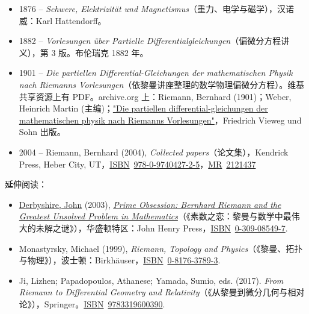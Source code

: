 \begin{itemize}
\item
  {1876 -- \emph{Schwere, Elektrizität und Magnetismus}（重力、电学与磁学），汉诺威：Karl Hattendorff。}
\item
  {1882 -- \emph{Vorlesungen über Partielle Differentialgleichungen}（偏微分方程讲义），第 3 版。布伦瑞克 1882 年。}
\item
  {1901 -- \emph{Die partiellen Differential-Gleichungen der mathematischen Physik nach Riemann\textquotesingle s Vorlesungen}（依黎曼讲座整理的数学物理偏微分方程）。维基共享资源上有 PDF。archive.org 上：Riemann, Bernhard (1901)；Weber, Heinrich Martin (主编)；\href{https://archive.org/details/diepartiellendi02webegoog}{"Die partiellen differential-gleichungen der mathematischen physik nach Riemann\textquotesingle s Vorlesungen"}，Friedrich Vieweg und Sohn 出版。}
\item
  {2004 -- Riemann, Bernhard (2004), \emph{Collected papers}（论文集），Kendrick Press, Heber City, UT，\href{https://en.wikipedia.org/wiki/ISBN_(identifier)}{ISBN}{~}\href{https://en.wikipedia.org/wiki/Special:BookSources/978-0-9740427-2-5}{978-0-9740427-2-5}，\href{https://en.wikipedia.org/wiki/MR_(identifier)}{MR}{~}\href{https://mathscinet.ams.org/mathscinet-getitem?mr=2121437}{2121437}{}}
\end{itemize}




延伸阅读：

\begin{itemize}
\tightlist
\item
  {\href{https://en.wikipedia.org/wiki/John_Derbyshire}{Derbyshire, John} (2003), \emph{\href{https://en.wikipedia.org/wiki/Prime_Obsession}{Prime Obsession: Bernhard Riemann and the Greatest Unsolved Problem in Mathematics}}（《素数之恋：黎曼与数学中最伟大的未解之谜》），华盛顿特区：John Henry Press，\href{https://en.wikipedia.org/wiki/ISBN_(identifier)}{ISBN}{~}\href{https://en.wikipedia.org/wiki/Special:BookSources/0-309-08549-7}{0-309-08549-7}.}
\item
  {Monastyrsky, Michael (1999), \emph{Riemann, Topology and Physics}（《黎曼、拓扑与物理》），波士顿：Birkhäuser，\href{https://en.wikipedia.org/wiki/ISBN_(identifier)}{ISBN}{~}\href{https://en.wikipedia.org/wiki/Special:BookSources/0-8176-3789-3}{0-8176-3789-3}.}
\item
  {Ji, Lizhen; Papadopoulos, Athanese; Yamada, Sumio, eds. (2017). \emph{From Riemann to Differential Geometry and Relativity}（《从黎曼到微分几何与相对论》），Springer。\href{https://en.wikipedia.org/wiki/ISBN_(identifier)}{ISBN}{~}\href{https://en.wikipedia.org/wiki/Special:BookSources/9783319600390}{9783319600390}.}
\end{itemize}



